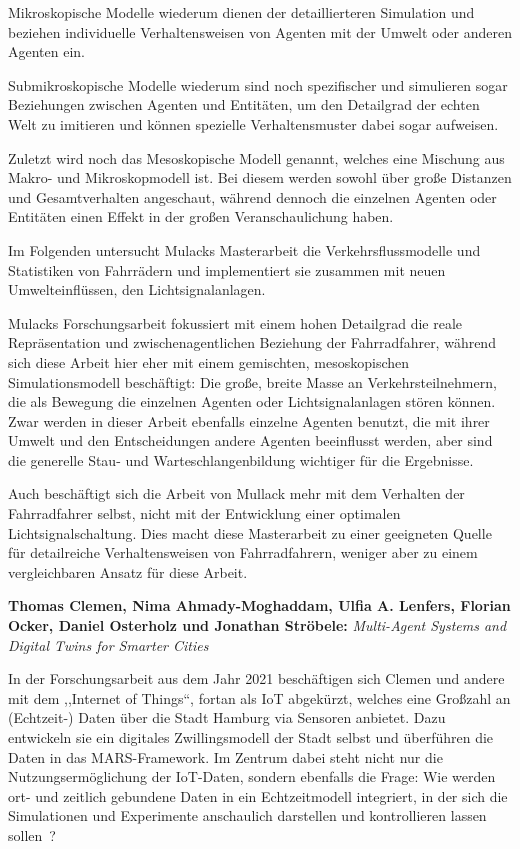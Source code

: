Mikroskopische Modelle wiederum dienen der detaillierteren Simulation und beziehen individuelle Verhaltensweisen von Agenten mit der Umwelt oder anderen Agenten ein\cite{Mulack2020}.

Submikroskopische Modelle wiederum sind noch spezifischer und simulieren sogar Beziehungen zwischen Agenten und Entitäten, um den Detailgrad der echten Welt zu imitieren und können spezielle Verhaltensmuster dabei sogar aufweisen\cite{Mulack2020}.

Zuletzt wird noch das Mesoskopische Modell genannt, welches eine Mischung aus Makro- und Mikroskopmodell ist.
Bei diesem werden sowohl über große Distanzen und Gesamtverhalten angeschaut, während dennoch die einzelnen Agenten oder Entitäten einen Effekt in der großen Veranschaulichung haben\cite{Mulack2020}.

Im Folgenden untersucht Mulacks Masterarbeit die Verkehrsflussmodelle und Statistiken von Fahrrädern und implementiert sie zusammen mit neuen Umwelteinflüssen, den Lichtsignalanlagen.

Mulacks Forschungsarbeit fokussiert mit einem hohen Detailgrad die reale Repräsentation und zwischenagentlichen Beziehung der Fahrradfahrer, während sich diese Arbeit hier eher mit einem gemischten, mesoskopischen Simulationsmodell beschäftigt: Die große, breite Masse an Verkehrsteilnehmern, die als Bewegung die einzelnen Agenten oder Lichtsignalanlagen stören können.
Zwar werden in dieser Arbeit ebenfalls einzelne Agenten benutzt, die mit ihrer Umwelt und den Entscheidungen andere Agenten beeinflusst werden, aber sind die generelle Stau- und Warteschlangenbildung wichtiger für die Ergebnisse.

Auch beschäftigt sich die Arbeit von Mullack mehr mit dem Verhalten der Fahrradfahrer selbst, nicht mit der Entwicklung einer optimalen Lichtsignalschaltung.
Dies macht diese Masterarbeit zu einer geeigneten Quelle für detailreiche Verhaltensweisen von Fahrradfahrern, weniger aber zu einem vergleichbaren Ansatz für diese Arbeit.


\textbf{Thomas Clemen, Nima Ahmady-Moghaddam, Ulfia A. Lenfers, Florian Ocker, Daniel Osterholz und Jonathan Ströbele:}
\textit{Multi-Agent Systems and Digital Twins for Smarter Cities}

In der Forschungsarbeit aus dem Jahr 2021 beschäftigen sich Clemen und andere mit dem ,,Internet of Things``, fortan als IoT abgekürzt, welches eine Großzahl an (Echtzeit-) Daten über die Stadt Hamburg via Sensoren anbietet.
Dazu entwickeln sie ein digitales Zwillingsmodell der Stadt selbst und überführen die Daten in das MARS-Framework.
Im Zentrum dabei steht nicht nur die Nutzungsermöglichung der IoT-Daten, sondern ebenfalls die Frage: Wie werden ort- und zeitlich gebundene Daten in ein Echtzeitmodell integriert, in der sich die Simulationen und Experimente anschaulich darstellen und kontrollieren lassen sollen~\cite{Clemen2021}?

